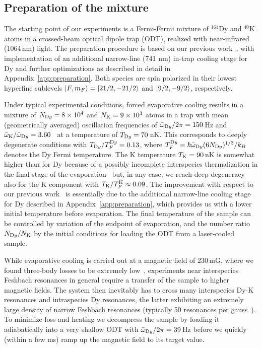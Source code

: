 \subsection{\label{subsec:prep}Preparation of the mixture}

The starting point of our experiments is a Fermi-Fermi mixture of $^{161}$Dy and $^{40}$K atoms in a crossed-beam optical dipole trap (ODT), realized with near-infrared (1064\,nm) light. The preparation procedure is based on our previous work~\cite{Ravensbergen2018poa}, with implementation of an additional narrow-line (741 nm) in-trap cooling stage for Dy and further optimizations as described in detail in Appendix~\ref{app:preparation}.
Both species are spin polarized in their lowest hyperfine sublevels $\ket{F, m_F} = \ket{21/2, -21/2}$ and $\ket{9/2, -9/2}$, respectively. 

Under typical experimental conditions, forced evaporative cooling results in a mixture of $N_{\textrm Dy} = 8\times 10^4$ and $N_{\textrm K}=9 \times 10^3$ atoms in a trap with mean (geometrically averaged) oscillation frequencies of $\bar{\omega}_{\textrm Dy}/2\pi = 150$\,Hz and $\bar{\omega}_{\textrm K}/\bar{\omega}_{\textrm Dy} = 3.60$~\cite{Ravensbergen2018ado} at a temperature of $T_{\textrm Dy} = 70$\,nK. This corresponds to deeply degenerate conditions with $T_{\textrm Dy}/ T_{F}^{\textrm Dy}= 0.13$, 
where $T_{F}^{\textrm Dy} = \hbar \bar{\omega}_{\textrm Dy} (6 N_{\textrm Dy})^{1/3} /k_{B}$ denotes the Dy Fermi temperature. The K temperature $T_{\textrm K} = 90$\,nK is somewhat higher than for Dy because of a possibly incomplete interspecies thermalization in the final stage of the evaporation~\cite{Ravensbergen2018poa} but, in any case, we reach deep degeneracy also for the K component with $T_{\textrm K} / T_{F}^{\textrm K}\approx0.09$. The improvement with respect to our previous work~\cite{Ravensbergen2018poa} is essentially due to the additional narrow-line cooling stage for Dy described in Appendix~\ref{app:preparation}, which provides us with a lower initial temperature before evaporation. The final temperature of the sample can be controlled by variation of the endpoint of evaporation, and the number ratio $N_{\textrm Dy}/N_{\textrm K}$ by the initial conditions for loading the ODT from a laser-cooled sample.

While evaporative cooling is carried out at a magnetic field of 230\,mG, where we found three-body losses to be extremely low~\cite{Soave2022lff}, experiments near interspecies Feshbach resonances in general require a transfer of the sample to higher magnetic fields. The system then inevitably has to cross many interspecies Dy-K resonances and intraspecies Dy resonances, the latter exhibiting an extremely large density of narrow Feshbach resonances (typically 50 resonances per gauss~\cite{Soave2022lff}). To minimize loss and heating we decompress the sample by loading it adiabatically into a very shallow ODT with $\bar{\omega}_{\textrm Dy}/2\pi = 39$\,Hz before we quickly (within a few ms) ramp up the magnetic field to its target value. 


